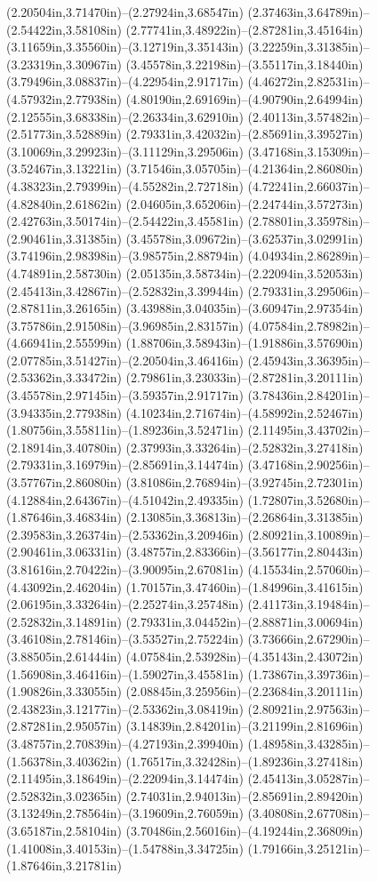 (2.20504in,3.71470in)--(2.27924in,3.68547in) (2.37463in,3.64789in)--(2.54422in,3.58108in) (2.77741in,3.48922in)--(2.87281in,3.45164in) (3.11659in,3.35560in)--(3.12719in,3.35143in) (3.22259in,3.31385in)--(3.23319in,3.30967in) (3.45578in,3.22198in)--(3.55117in,3.18440in) (3.79496in,3.08837in)--(4.22954in,2.91717in) (4.46272in,2.82531in)--(4.57932in,2.77938in) (4.80190in,2.69169in)--(4.90790in,2.64994in) (2.12555in,3.68338in)--(2.26334in,3.62910in) (2.40113in,3.57482in)--(2.51773in,3.52889in) (2.79331in,3.42032in)--(2.85691in,3.39527in) (3.10069in,3.29923in)--(3.11129in,3.29506in) (3.47168in,3.15309in)--(3.52467in,3.13221in) (3.71546in,3.05705in)--(4.21364in,2.86080in) (4.38323in,2.79399in)--(4.55282in,2.72718in) (4.72241in,2.66037in)--(4.82840in,2.61862in) (2.04605in,3.65206in)--(2.24744in,3.57273in) (2.42763in,3.50174in)--(2.54422in,3.45581in) (2.78801in,3.35978in)--(2.90461in,3.31385in) (3.45578in,3.09672in)--(3.62537in,3.02991in) (3.74196in,2.98398in)--(3.98575in,2.88794in) (4.04934in,2.86289in)--(4.74891in,2.58730in) (2.05135in,3.58734in)--(2.22094in,3.52053in) (2.45413in,3.42867in)--(2.52832in,3.39944in) (2.79331in,3.29506in)--(2.87811in,3.26165in) (3.43988in,3.04035in)--(3.60947in,2.97354in) (3.75786in,2.91508in)--(3.96985in,2.83157in) (4.07584in,2.78982in)--(4.66941in,2.55599in) (1.88706in,3.58943in)--(1.91886in,3.57690in) (2.07785in,3.51427in)--(2.20504in,3.46416in) (2.45943in,3.36395in)--(2.53362in,3.33472in) (2.79861in,3.23033in)--(2.87281in,3.20111in) (3.45578in,2.97145in)--(3.59357in,2.91717in) (3.78436in,2.84201in)--(3.94335in,2.77938in) (4.10234in,2.71674in)--(4.58992in,2.52467in) (1.80756in,3.55811in)--(1.89236in,3.52471in) (2.11495in,3.43702in)--(2.18914in,3.40780in) (2.37993in,3.33264in)--(2.52832in,3.27418in) (2.79331in,3.16979in)--(2.85691in,3.14474in) (3.47168in,2.90256in)--(3.57767in,2.86080in) (3.81086in,2.76894in)--(3.92745in,2.72301in) (4.12884in,2.64367in)--(4.51042in,2.49335in) (1.72807in,3.52680in)--(1.87646in,3.46834in) (2.13085in,3.36813in)--(2.26864in,3.31385in) (2.39583in,3.26374in)--(2.53362in,3.20946in) (2.80921in,3.10089in)--(2.90461in,3.06331in) (3.48757in,2.83366in)--(3.56177in,2.80443in) (3.81616in,2.70422in)--(3.90095in,2.67081in) (4.15534in,2.57060in)--(4.43092in,2.46204in) (1.70157in,3.47460in)--(1.84996in,3.41615in) (2.06195in,3.33264in)--(2.25274in,3.25748in) (2.41173in,3.19484in)--(2.52832in,3.14891in) (2.79331in,3.04452in)--(2.88871in,3.00694in) (3.46108in,2.78146in)--(3.53527in,2.75224in) (3.73666in,2.67290in)--(3.88505in,2.61444in) (4.07584in,2.53928in)--(4.35143in,2.43072in) (1.56908in,3.46416in)--(1.59027in,3.45581in) (1.73867in,3.39736in)--(1.90826in,3.33055in) (2.08845in,3.25956in)--(2.23684in,3.20111in) (2.43823in,3.12177in)--(2.53362in,3.08419in) (2.80921in,2.97563in)--(2.87281in,2.95057in) (3.14839in,2.84201in)--(3.21199in,2.81696in) (3.48757in,2.70839in)--(4.27193in,2.39940in) (1.48958in,3.43285in)--(1.56378in,3.40362in) (1.76517in,3.32428in)--(1.89236in,3.27418in) (2.11495in,3.18649in)--(2.22094in,3.14474in) (2.45413in,3.05287in)--(2.52832in,3.02365in) (2.74031in,2.94013in)--(2.85691in,2.89420in) (3.13249in,2.78564in)--(3.19609in,2.76059in) (3.40808in,2.67708in)--(3.65187in,2.58104in) (3.70486in,2.56016in)--(4.19244in,2.36809in) (1.41008in,3.40153in)--(1.54788in,3.34725in) (1.79166in,3.25121in)--(1.87646in,3.21781in) 